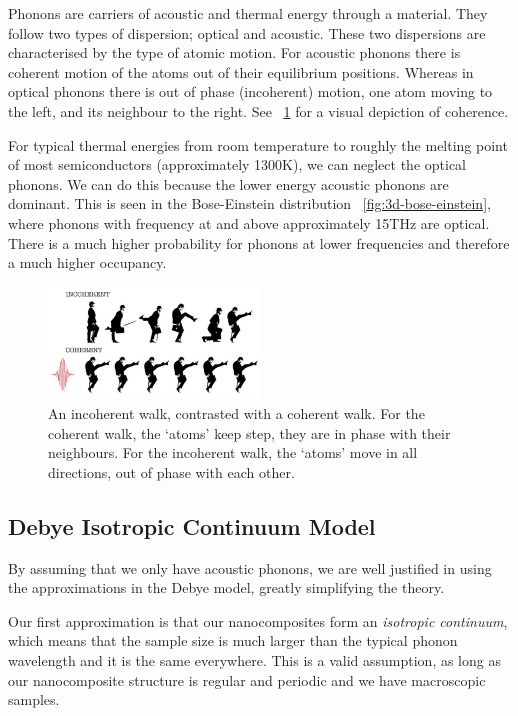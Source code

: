 \documentclass[12pt]{article}
\newcommand{\figref}[2][\figurename~]{#1\ref{#2}}
\begin{document}
Phonons are carriers of acoustic and thermal energy through a material. They follow two types of dispersion; optical and acoustic. These two dispersions are characterised by the type of atomic motion. For acoustic phonons there is coherent motion of the atoms out of their equilibrium positions. Whereas in optical phonons there is out of phase (incoherent) motion, one atom moving to the left, and its neighbour to the right. See \figref{fig:coherence-walk} for a visual depiction of coherence.

For typical thermal energies from room temperature to roughly the melting point of most semiconductors (approximately 1300K), we can neglect the optical phonons. We can do this because the lower energy acoustic phonons are dominant. This is seen in the Bose-Einstein distribution \figref{fig:3d-bose-einstein}, where phonons with frequency at and above approximately 15THz are optical. There is a much higher probability for phonons at lower frequencies and therefore a much higher occupancy.

\begin{figure}
	\centering
	\includegraphics[width=0.5\textwidth]{coherence-walk.png}
	\caption{An incoherent walk, contrasted with a coherent walk. For the coherent walk, the `atoms' keep step, they are in phase with their neighbours. For the incoherent walk, the `atoms' move in all directions, out of phase with each other.}
	\label{fig:coherence-walk}
\end{figure}

\subsection{Debye Isotropic Continuum Model}
By assuming that we only have acoustic phonons, we are well justified in using the approximations in the Debye model, greatly simplifying the theory.

Our first approximation is that our nanocomposites form an \emph{isotropic continuum}, which means that the sample size is much larger than the typical phonon wavelength and it is the same everywhere. This is a valid assumption, as long as our nanocomposite structure is regular and periodic and we have macroscopic samples.
\end{document}
